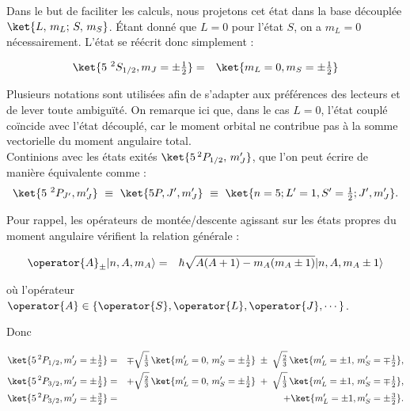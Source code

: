 Dans le but de faciliter les calculs, nous projetons cet état dans la base découplée $\ket{L,\,m_L;\,S,\,m_S}$. Étant donné que $L = 0$ pour l’état $S$, on a $m_L = 0$ nécessairement. L’état se réécrit donc simplement :


\begin{eqnarray*}
	\ket{ 5{~}^2S_{1/2} , m_J = \pm \tfrac12  } & = & \ket{  m_L = 0  , m_S= \pm \tfrac12  }  	
\end{eqnarray*}


Plusieurs notations sont utilisées afin de s’adapter aux préférences des lecteurs et de lever toute ambiguïté.
On remarque ici que, dans le cas $L = 0$, l’état couplé coïncide avec l’état découplé, car le moment orbital ne contribue pas à la somme vectorielle du moment angulaire total.\\

Continions avec les états exités $\ket{5\,^2P_{1/2},\,m_J'}$, que l’on peut écrire de manière équivalente comme :
\begin{eqnarray*}
	\ket{ 5{~}^2P_{J'} , m_J'  } ~\equiv~ \ket{ 5P , J'  , m_J' }  ~\equiv~ \ket{n=5 ; L'=1 , S'=\tfrac12 ;  J'  , m_J'  }.
\end{eqnarray*}

Pour rappel, les opérateurs de montée/descente agissant sur les états propres du moment angulaire vérifient la relation générale :


\begin{eqnarray}
	\operator{A}_\pm \vert n , A , m	_A \rangle & = & \hbar \sqrt{A(A+1) - m_A(m_A\pm 1 ) } \vert n , A , m	_A \pm 1  \rangle
\end{eqnarray}

où l'opérateur $\operator{A} \in \{ \operator{S} , \operator{L} , \operator{J} , \cdots \}$.

Donc 

\begin{eqnarray*} 
	\ket{5\,^2P_{1/2},m_J' = \pm\tfrac12} &=& \mp\sqrt{\tfrac{1}{3}}\,\ket{ m_L'=0,\,m_S'=\pm\tfrac12} \;\pm\;\sqrt{\tfrac{2}{3}}\,\ket{m_L'=\pm 1,\,m_S'=\mp\tfrac12},\\ 
	\ket{5\,^2P_{3/2},m_J' = \pm\tfrac12} &=& +\sqrt{\tfrac{2}{3}}\,\ket{m_L'=0,\,m_S'=\pm\tfrac12} \;+\;\sqrt{\tfrac{1}{3}}\,\ket{ m_L'=\pm 1,\,m_S'=\mp\tfrac12},\\
	\ket{5\,^2P_{3/2},m_J' = \pm\tfrac32} &= & +\ket{m_L'=\pm 1 , m_S' = \pm \tfrac32}.  
\end{eqnarray*}
 
